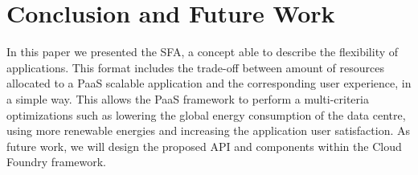 \section{Conclusion and Future Work}
\label{sec: conclusion}

In this paper we presented the SFA, a concept able to describe the flexibility of applications.
This format includes the trade-off between amount of resources allocated to a PaaS scalable application and the corresponding user experience, in a simple way.
This allows the PaaS framework to perform a multi-criteria optimizations such as lowering the global energy consumption of the data centre, using more renewable energies and increasing the application user satisfaction.
As future work, we will design the proposed API and components within the Cloud Foundry framework.
